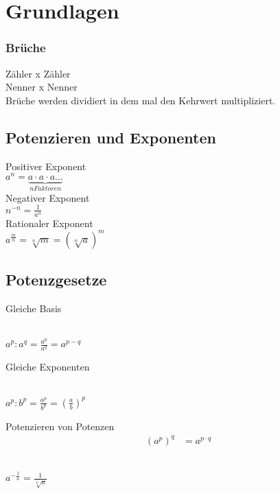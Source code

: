 \section{Grundlagen}
\setlength{\columnseprule}{1px}
\subsubsection{Brüche}
Zähler x Zähler\\
Nenner x  Nenner \\

Brüche werden dividiert in dem mal den Kehrwert multipliziert.\\

\subsection{Potenzieren und Exponenten}

\begin{multicols}{3}
  {\color{fulda_green}Positiver} Exponent\\
  \newline
  \columnbreak
  $a^n = \underbrace{a \cdot a \cdot a ...}_{n Faktoren}$ \\
  {\color{red}Negativer} Exponent\\
  \newline
  \columnbreak
  $n^{-n} = \frac{1}{a^n}$ \\
  {\color{monoorange}Rationaler} Exponent\\
  \newline
  $a^{\frac{m}{n}} = \sqrt[n]{m} = (\sqrt[n]{a})^m$ \\
\end{multicols}

\subsection{Potenzgesetze}
Gleiche Basis

\begin{multicols}{2}
    \\
    \columnbreak
  $a^p : a^q = \frac{a^p}{a^q} = a^{p-q} $
\end{multicols}

Gleiche Exponenten
\begin{multicols}{2}
    \\
    \columnbreak
  $a^p : b^p = \frac{a^p}{b^p} = (\frac{a}{b})^p $
\end{multicols}

Potenzieren von Potenzen
\begin{align*}
  (a^p)^q &= a^{p \cdot q}
\end{align*}


\begin{multicols}{2}
    \\
    \columnbreak
  $a^{-\frac{1}{n}} = \frac{1}{\sqrt[n]{a}} $
\end{multicols}
